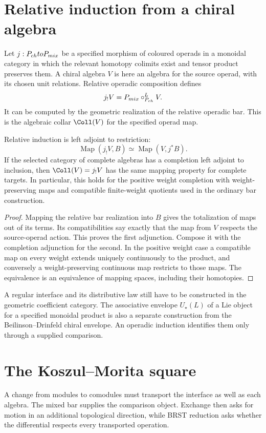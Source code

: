 \section{Relative induction from a chiral algebra}
Let $j:P_{ch}toP_{mix}$ be a specified
morphism of coloured operads in a monoidal category in which the relevant
homotopy colimits exist and tensor product preserves them. A chiral algebra
$V$ is here an algebra for the source operad, with its chosen unit relations.
Relative operadic composition defines
\[
 j_!V=P_{mix}
       \circ^{L}_{P_{ch}}V.
\]
It can be computed by the geometric realization of the relative operadic bar.
This is the algebraic collar $\Coll(V)$ for the specified operad map.

\begin{theorem}
Relative induction is left adjoint to restriction:
\[
 \operatorname{Map}(j_!V,B)
 \simeq\operatorname{Map}(V,j^*B).
\]
If the selected category of complete algebras has a completion left adjoint
to inclusion, then $\widehat\Coll(V)=\widehat{j_!V}$ has the same mapping
property for complete targets. In particular, this holds for the positive
weight completion with weight-preserving maps and compatible finite-weight
quotients used in the ordinary bar construction.
\end{theorem}
\begin{proof}
Mapping the relative bar realization into $B$ gives the totalization of
maps out of its terms. Its compatibilities say exactly that the map from
$V$ respects the source-operad action. This proves the first adjunction.
Compose it with the completion adjunction for the second. In the positive
weight case a compatible map on every weight extends uniquely continuously
to the product, and conversely a weight-preserving continuous map restricts
to those maps. The equivalence is an equivalence of mapping spaces, including
their homotopies.
\end{proof}

A regular interface and its distributive law still have to be constructed
in the geometric coefficient category. The associative envelope
$U_\star(L)$ of a Lie object for a specified monoidal product is also a
separate construction from the Beilinson--Drinfeld chiral envelope. An
operadic induction identifies them only through a supplied comparison.

\section{The Koszul--Morita square}
A change from modules to comodules must transport the interface as well as each algebra. The mixed bar supplies the comparison object. Exchange then asks for motion in an additional topological direction, while BRST reduction asks whether the differential respects every transported operation.

